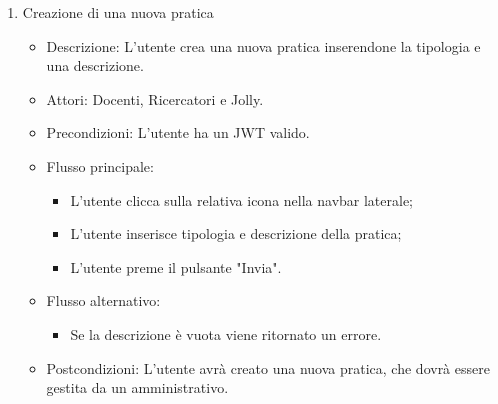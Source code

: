 \documentclass{article}
\begin{document}
\begin{enumerate}
    \item Creazione di una nuova pratica
    \begin{itemize}
        \item Descrizione: L'utente crea una nuova pratica inserendone la tipologia e una descrizione.
        \item Attori: Docenti, Ricercatori e Jolly.
        \item Precondizioni: L'utente ha un JWT valido.
        \item Flusso principale: \begin{itemize}
            \item L'utente clicca sulla relativa icona nella navbar laterale;
            \item L'utente inserisce tipologia e descrizione della pratica;
            \item L'utente preme il pulsante "Invia".
        \end{itemize}
        \item Flusso alternativo: \begin{itemize}
            \item Se la descrizione è vuota viene ritornato un errore.
        \end{itemize}
        \item Postcondizioni: L'utente avrà creato una nuova pratica, che dovrà essere gestita da un amministrativo.
    \end{itemize}


\end{enumerate}
\end{document}
